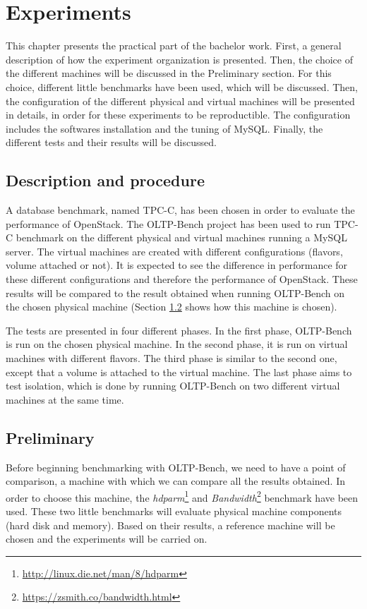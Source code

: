 

\chapter{Experiments}
This chapter presents the practical part of the bachelor work.
First, a general description of how the experiment organization is presented.
Then, the choice of the different machines will be discussed in the Preliminary section.
For this choice, different little benchmarks have been used, which will be discussed.
Then, the configuration of the different physical and virtual machines will be presented in details, in order for these experiments to be reproductible.
The configuration includes the softwares installation and the tuning of MySQL.
Finally, the different tests and their results will be discussed.


\section{Description and procedure}
A database benchmark, named TPC-C, has been chosen in order to evaluate the performance of OpenStack.
The OLTP-Bench project has been used to run TPC-C benchmark on the different physical and virtual machines running a MySQL server.
The virtual machines are created with different configurations (flavors, volume attached or not). 
It is expected to see the difference in performance for these different configurations and therefore the performance of OpenStack.
These results will be compared to the result obtained when running OLTP-Bench on the chosen physical machine (Section \ref{sec:preliminary} shows how this machine is chosen).

The tests are presented in four different phases.
In the first phase, OLTP-Bench is run on the chosen physical machine.
In the second phase, it is run on virtual machines with different flavors.
The third phase is similar to the second one, except that a volume is attached to the virtual machine.
The last phase aims to test isolation, which is done by running OLTP-Bench on two different virtual machines at the same time.




\section{Preliminary}
\label{sec:preliminary}
Before beginning benchmarking with OLTP-Bench, we need to have a point of comparison, a machine with which we can compare all the results obtained. 
In order to choose this machine, the \textit{hdparm}\footnote{\url{http://linux.die.net/man/8/hdparm}} and \textit{Bandwidth}\footnote{\url{https://zsmith.co/bandwidth.html}} benchmark have been used. 
These two little benchmarks will evaluate physical machine components (hard disk and memory).
Based on their results, a reference machine will be chosen and the experiments will be carried on.


